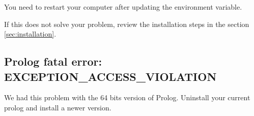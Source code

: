 You need to restart your computer after updating the environment variable.

If this does not solve your problem, review the installation steps in the section \ref{sec:installation}.

\subsection{Prolog fatal error: EXCEPTION\_ACCESS\_VIOLATION}

We had this problem with the 64 bits version of Prolog.
Uninstall your current prolog and install a newer version.















